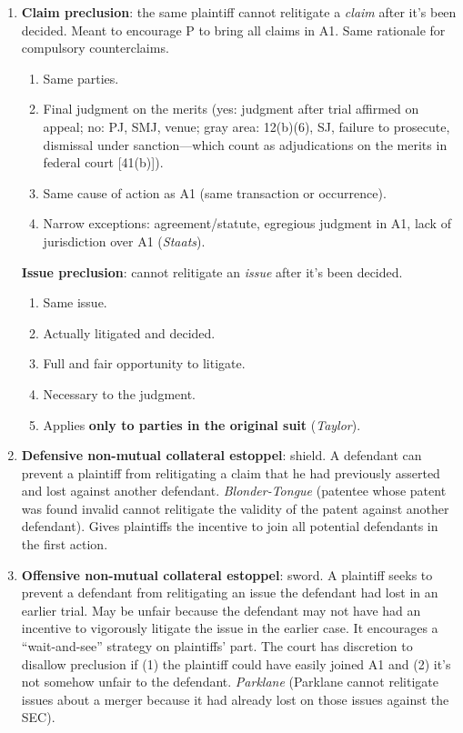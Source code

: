 \begin{enumerate}
    \item \textbf{Claim preclusion}: the same plaintiff cannot relitigate a 
    \emph{claim} after it's been decided. Meant to encourage P to bring all claims in 
    A1. Same rationale for compulsory counterclaims.
    \begin{enumerate}
        \item Same parties.
        \item Final judgment on the merits (yes: judgment after trial affirmed 
        on appeal; no: PJ, SMJ, venue; gray area: 12(b)(6), SJ, failure to 
        prosecute, dismissal under sanction---which count as adjudications on 
        the merits in federal court [41(b)]).
        \item Same cause of action as A1 (same transaction or occurrence).
        \item Narrow exceptions: agreement/statute, egregious judgment in A1, 
        lack of jurisdiction over A1 (\emph{Staats}).        
    \end{enumerate}
    \textbf{Issue preclusion}: cannot relitigate an \emph{issue} after it's 
    been decided.
    \begin{enumerate}
        \item Same issue.
        \item Actually litigated and decided.
        \item Full and fair opportunity to litigate.
        \item Necessary to the judgment.
        \item Applies \textbf{only to parties in the original suit} 
        (\emph{Taylor}).
    \end{enumerate}
    \item \textbf{Defensive non-mutual collateral estoppel}: shield. A 
    defendant can prevent a plaintiff from relitigating a claim that he had 
    previously asserted and lost against another defendant. 
    \emph{Blonder-Tongue} (patentee whose patent was found invalid cannot 
    relitigate the validity of the patent against another defendant). Gives 
    plaintiffs the incentive to join all potential defendants in the first 
    action.
    \item \textbf{Offensive non-mutual collateral estoppel}: sword. A 
    plaintiff seeks to prevent a defendant from relitigating an issue the 
    defendant had lost in an earlier trial. May be unfair because the 
    defendant may not have had an incentive to vigorously litigate the issue 
    in the earlier case. It encourages a ``wait-and-see'' strategy on 
    plaintiffs' part. The court has discretion to disallow preclusion if (1) 
    the plaintiff could have easily joined A1 and (2) it's not somehow unfair 
    to the defendant. \emph{Parklane} (Parklane cannot relitigate issues about 
    a merger because it had already lost on those issues against the SEC).  
\end{enumerate}

